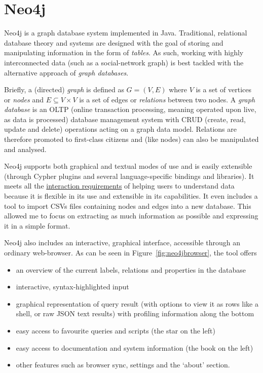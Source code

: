 \section{Neo4j}\label{sec:neo4j}

Neo4j is a graph database system implemented in Java. Traditional, relational
database theory and systems are designed with the goal of storing and
manipulating information in the form of \emph{tables}. As such, working with
highly interconnected data (such as a social-network graph) is best tackled with
the alternative approach of \emph{graph databases}.

Briefly, a (directed) \emph{graph} is defined as $G = (V, E)$ where $V$ is a set
of vertices or \emph{nodes} and $E \subseteq V \times V$ is a set of edges or
\emph{relations} between two nodes. A \emph{graph database} is an OLTP (online
transaction processing, meaning operated upon live, as data is processed)
database management system with CRUD (create, read, update and delete)
operations acting on a graph data model. Relations are therefore promoted to
first-class citizens and (like nodes) can also be manipulated and analysed.

Neo4j supports both graphical and textual modes of use and is easily extensible
(through Cypher plugins and several language-specific bindings and libraries).
It meets all the \hyperref[req:i1]{interaction requirements} of helping users to
understand data because it is flexible in its use and extensible in its
capabilities.  It even includes a tool to import CSVs files containing nodes and
edges into a new database. This allowed me to focus on extracting as much
information as possible and expressing it in a simple format.

Neo4j also includes an interactive, graphical interface, accessible through an
ordinary web-browser. As can be seen in Figure~\ref{fig:neo4jbrowser}, the tool
offers
\begin{itemize}
  \item an overview of the current labels, relations and properties in the
        database
  \item interactive, syntax-highlighted input
  \item graphical representation of query result (with options to view it as
        rows like a shell, or raw JSON text results) with profiling information
        along the bottom
  \item easy access to favourite queries and scripts (the star on the left)
  \item easy access to documentation and system information (the book on the
        left)
  \item other features such as browser sync, settings and the `about' section.
\end{itemize}

